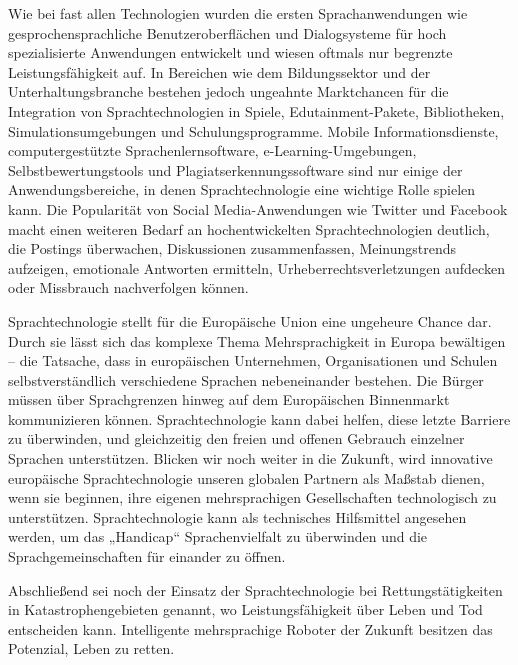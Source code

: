 \documentclass[]{../../metanetpaper}
\begin{document}
\begin{Parallel}[c]{79mm}{78mm}
{Wie bei fast allen Technologien wurden die ersten Sprachanwendungen wie gesprochensprachliche Benutzeroberflächen und Dialogsysteme für hoch spezialisierte Anwendungen entwickelt und wiesen oftmals nur begrenzte Leistungsfähigkeit auf. In Bereichen wie dem Bildungssektor und der Unterhaltungsbranche bestehen jedoch ungeahnte Marktchancen für die Integration von Sprachtechnologien in Spiele, Edutainment-Pakete, Bibliotheken, Simulationsumgebungen und Schulungsprogramme. Mobile Informationsdienste, computergestützte Sprachenlernsoftware, e-Learning-Umgebungen, Selbstbewertungstools und Plagiatserkennungssoftware sind nur einige der Anwendungsbereiche, in denen Sprachtechnologie eine wichtige Rolle spielen kann. Die Popularität von Social Media-Anwendungen wie Twitter und Facebook macht einen weiteren Bedarf an hochentwickelten Sprachtechnologien deutlich, die Postings überwachen, Diskussionen zusammenfassen, Meinungstrends aufzeigen, emotionale Antworten ermitteln, Urheberrechtsverletzungen aufdecken oder Missbrauch nachverfolgen können.

Sprachtechnologie stellt für die Europäische Union eine ungeheure Chance dar. Durch sie lässt sich das komplexe Thema Mehrsprachigkeit in Europa bewältigen – die Tatsache, dass in europäischen Unternehmen, Organisationen und Schulen selbstverständlich verschiedene Sprachen nebeneinander bestehen. Die Bürger müssen über Sprachgrenzen hinweg auf dem Europäischen Binnenmarkt kommunizieren können. Sprachtechnologie kann dabei helfen, diese letzte Barriere zu überwinden, und gleichzeitig den freien und offenen Gebrauch einzelner Sprachen unterstützen. Blicken wir noch weiter in die Zukunft, wird innovative europäische Sprachtechnologie unseren globalen Partnern als Maßstab dienen, wenn sie  beginnen, ihre eigenen mehrsprachigen Gesellschaften technologisch zu unterstützen. Sprachtechnologie kann als technisches Hilfsmittel angesehen werden, um das „Handicap“ Sprachenvielfalt zu überwinden und die Sprachgemeinschaften für einander zu öffnen.

Abschließend sei noch der Einsatz der Sprachtechnologie bei Rettungstätigkeiten in Katastrophengebieten genannt, wo Leistungsfähigkeit über Leben und Tod entscheiden kann. Intelligente mehrsprachige Roboter der Zukunft besitzen das Potenzial, Leben zu retten.
  }

\end{Parallel}
\end{document}
